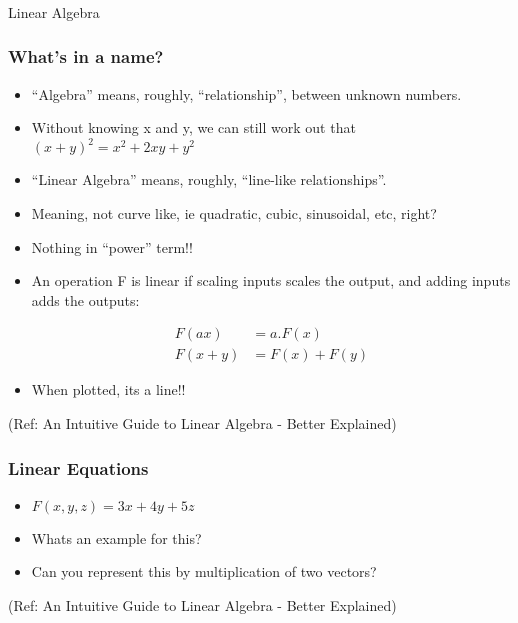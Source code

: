 \begin{frame}[fragile]\frametitle{}
\begin{center}
{\Large Linear Algebra }
\end{center}
\end{frame}

\begin{frame}[fragile]\frametitle{What's in a name?}
\begin{itemize}
\item ``Algebra'' means, roughly, ``relationship'', between unknown numbers.
\item Without knowing x and y, we can still work out that $(x + y)^2 = x^2 + 2xy + y^2$ 

\item ``Linear Algebra'' means, roughly, ``line-like relationships''.

\item Meaning, not curve like, ie quadratic, cubic, sinusoidal, etc, right? \item Nothing in ``power'' term!!

\item An operation F is linear if scaling inputs scales the output, and adding inputs adds the outputs:

\begin{align*}
    F(ax) &= a.F(x) \\
		F(x+y) &= F(x) + F(y)
\end{align*}

\item When plotted, its a line!!
\end{itemize}

{\tiny (Ref: An Intuitive Guide to Linear Algebra - Better Explained)}
\end{frame}


\begin{frame}[fragile]\frametitle{Linear Equations}
\begin{itemize}
\item $F(x,y,z) = 3x + 4y + 5z$
\item Whats an example for this?
\item Can you represent this by multiplication of two vectors?
\end{itemize}

{\tiny (Ref: An Intuitive Guide to Linear Algebra - Better Explained)}
\end{frame}

